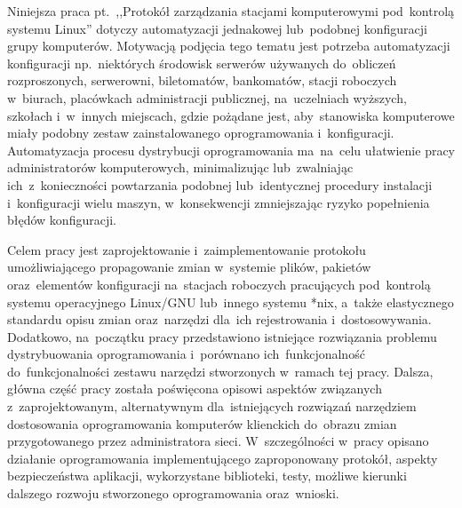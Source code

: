 \documentclass[12pt,a4paper]{article}
\begin{document}
Niniejsza praca pt.~,,Protokół zarządzania stacjami komputerowymi pod~kontrolą systemu Linux'' dotyczy automatyzacji jednakowej lub~podobnej konfiguracji grupy komputerów. Motywacją podjęcia tego tematu jest potrzeba automatyzacji konfiguracji np.~niektórych środowisk serwerów używanych do~obliczeń rozproszonych, serwerowni, biletomatów, bankomatów, stacji roboczych w~biurach, placówkach administracji publicznej, na~uczelniach wyższych, szkołach i~w~innych miejscach, gdzie pożądane jest, aby~stanowiska komputerowe miały podobny zestaw zainstalowanego oprogramowania i~konfiguracji. Automatyzacja procesu dystrybucji oprogramowania ma~na~celu ułatwienie pracy administratorów komputerowych, minimalizując lub~zwalniając ich~z~konieczności powtarzania podobnej lub~identycznej procedury instalacji i~konfiguracji wielu maszyn, w~konsekwencji zmniejszając ryzyko popełnienia błędów konfiguracji.

Celem pracy jest zaprojektowanie i~zaimplementowanie protokołu umożliwiającego propagowanie zmian w~systemie plików, pakietów oraz~elementów konfiguracji na~stacjach roboczych pracujących pod~kontrolą systemu operacyjnego Linux/GNU lub~innego systemu *nix, a~także elastycznego standardu opisu zmian oraz~narzędzi dla~ich rejestrowania i~dostosowywania. Dodatkowo, na~początku pracy przedstawiono istniejące rozwiązania problemu dystrybuowania oprogramowania i~porównano ich~funkcjonalność do~funkcjonalności zestawu narzędzi stworzonych w~ramach tej pracy. Dalsza, główna część pracy została poświęcona opisowi aspektów związanych z~zaprojektowanym, alternatywnym dla~istniejących rozwiązań narzędziem dostosowania oprogramowania komputerów klienckich do~obrazu zmian przygotowanego przez administratora sieci. W~szczególności w~pracy opisano działanie oprogramowania implementującego zaproponowany protokół, aspekty bezpieczeństwa aplikacji, wykorzystane biblioteki, testy, możliwe kierunki dalszego rozwoju stworzonego oprogramowania oraz~wnioski.
\end{document}
